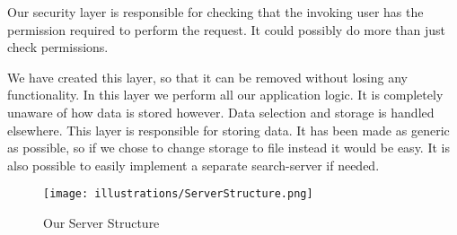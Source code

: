 Our security layer is responsible for checking that the invoking user has the permission required to perform the request. It could possibly do more than just check permissions.

We have created this layer, so that it can be removed without losing any functionality.
In this layer we perform all our application logic. It is completely unaware of how data is stored however. Data selection and storage is handled elsewhere.
This layer is responsible for storing data. It has been made as generic as possible, so if we chose to change storage to file instead it would be easy. It is also possible to easily implement a separate search-server if needed.

\begin{figure}[H]
  \texttt{[image: illustrations/ServerStructure.png]}
  \caption{Our Server Structure}
  \label{fig:serverstructure}
\end{figure}
\newpage